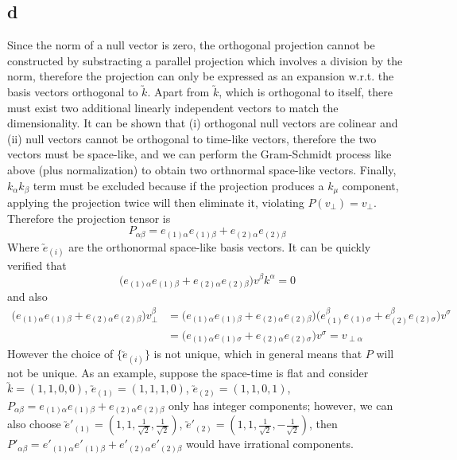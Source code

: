 \documentclass{article}
\begin{document}
\subsection*{d}
Since the norm of a null vector is zero, the orthogonal projection cannot be constructed by substracting a parallel projection which involves a division by the norm, therefore the projection can only be expressed as an expansion w.r.t. the basis vectors orthogonal to $\utilde{k}$. Apart from $\utilde{k}$, which is orthogonal to itself, there must exist two additional linearly independent vectors to match the dimensionality. It can be shown that (i) orthogonal null vectors are colinear and (ii) null vectors cannot be orthogonal to time-like vectors, therefore the two vectors must be space-like, and we can perform the Gram-Schmidt process like above (plus normalization) to obtain two orthnormal space-like vectors. Finally, $k_\alpha k_\beta$ term must be excluded because if the projection produces a $k_\mu$ component, applying the projection twice will then eliminate it, violating $P(v_\perp) = v_\perp$. Therefore the projection tensor is
\[ P_{\alpha\beta} = e_{(1)\alpha}e_{(1)\beta} + e_{(2)\alpha}e_{(2)\beta}\]
Where $\utilde{e}_{(i)}$ are the orthonormal space-like basis vectors. It can be quickly verified that
\[  \Big(e_{(1)\alpha}e_{(1)\beta} + e_{(2)\alpha}e_{(2)\beta}\Big) v^\beta k^\alpha = 0 \]
and also
\begin{align*}
\Big(e_{(1)\alpha}e_{(1)\beta} + e_{(2)\alpha}e_{(2)\beta}\Big)v_\perp^\beta
&=  \Big(e_{(1)\alpha}e_{(1)\beta} + e_{(2)\alpha}e_{(2)\beta}\Big)
	\Big(e_{(1)}^\beta e_{(1)\sigma} + e_{(2)}^\beta e_{(2)\sigma}\Big)v^\sigma  \\
&= \Big(e_{(1)\alpha} e_{(1)\sigma} + e_{(2)\alpha} e_{(2)\sigma}\Big)v^\sigma = v_{\perp\alpha}
\end{align*}
However the choice of $\{ \utilde{e}_{(i)} \}$ is not unique, which in general means that $P$ will not be unique. As an example, suppose the space-time is flat and consider $\utilde{k} = (1,1,0,0)$, $\utilde{e}_{(1)} = (1,1,1,0)$, $\utilde{e}_{(2)} = (1,1,0,1)$, $P_{\alpha\beta} = e_{(1)\alpha}e_{(1)\beta} + e_{(2)\alpha}e_{(2)\beta}$ only has integer components; however, we can also choose $\utilde{e}'_{(1)} = (1,1,\frac{1}{\sqrt{2}},\frac{1}{\sqrt{2}})$, $\utilde{e}'_{(2)} = (1,1, \frac{1}{\sqrt{2}},-\frac{1}{\sqrt{2}})$, then $P'_{\alpha\beta} = e'_{(1)\alpha}e'_{(1)\beta} + e'_{(2)\alpha}e'_{(2)\beta}$
would have irrational components.
\section{}
\end{document}
